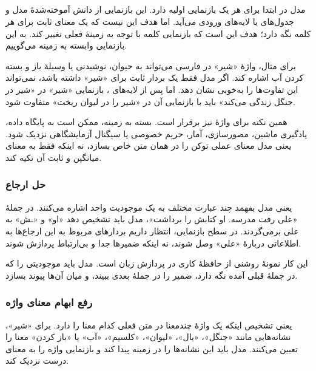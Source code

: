 \subsection{}
مدل در ابتدا برای هر  یک بازنمایی اولیه دارد. این بازنمایی از دانش آموخته‌شدهٔ مدل و جدول‌های  یا لایه‌های ورودی می‌آید. اما هدف  این نیست که یک معنای ثابت برای هر کلمه نگه دارد؛ هدف این است که بازنمایی کلمه با توجه به زمینهٔ فعلی تغییر کند. به این بازنمایی وابسته به زمینه  می‌گوییم.

برای مثال، واژهٔ «شیر» در فارسی می‌تواند به حیوان، نوشیدنی یا وسیلهٔ باز و بسته کردن آب اشاره کند. اگر مدل فقط یک بردار ثابت برای «شیر» داشته باشد، نمی‌تواند این تفاوت‌ها را به‌خوبی نشان دهد. اما پس از لایه‌های ، بازنمایی «شیر» در «شیر در جنگل زندگی می‌کند» باید با بازنمایی آن در «شیر را در لیوان ریخت» متفاوت شود.

همین نکته برای واژهٔ  نیز برقرار است. بسته به زمینه،  ممکن است به پایگاه داده، یادگیری ماشین، مصورسازی، آمار، حریم خصوصی یا سیگنال آزمایشگاهی نزدیک شود.  یعنی مدل معنای عملی توکن را در همان متن خاص بسازد، نه اینکه فقط به معنای میانگین و ثابت آن تکیه کند.

\subsubsection{حل ارجاع}
 یعنی مدل بفهمد چند عبارت مختلف به یک موجودیت واحد اشاره می‌کنند. در جملهٔ «علی رفت مدرسه. او کتابش را برداشت»، مدل باید تشخیص دهد «او» و «ـش» به علی برمی‌گردند. در سطح بازنمایی، انتظار داریم بردارهای مربوط به این ارجاع‌ها به اطلاعاتی دربارهٔ «علی» وصل شوند، نه اینکه ضمیرها جدا و بی‌ارتباط پردازش شوند.

این کار نمونهٔ روشنی از حافظهٔ کاری در پردازش زبان است. مدل باید موجودیتی را که در جملهٔ قبلی آمده نگه دارد، ضمیر را در جملهٔ بعدی ببیند، و میان آن‌ها پیوند بسازد.

\subsubsection{رفع ابهام معنای واژه}
 یعنی تشخیص اینکه یک واژهٔ چندمعنا در متن فعلی کدام معنا را دارد. برای «شیر»، نشانه‌هایی مانند «جنگل»، «یال»، «لیوان»، «کلسیم»، «آب» یا «باز کردن» معنا را تعیین می‌کنند. مدل باید این نشانه‌ها را در زمینه پیدا کند و بازنمایی واژه را به معنای درست نزدیک کند.


